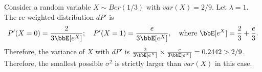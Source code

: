 \documentclass[11pt]{article}
\theoremstyle{plain}
\theoremstyle{definition}
\begin{document}
Consider a random variable $X \sim Ber(1/3)$ with $var(X) = 2/9$. Let $\lambda = 1$. The re-weighted distribution $dP'$ is
\[ P'(X = 0) = \frac{2}{3\bbE[ e^{X} ]};\quad  P'(X = 1) = \frac{e}{3\bbE[ e^{X} ]}, \quad \text{where } \bbE[ e^{X} ] = \frac{2}{3} + \frac{e}{3}.  \]
Therefore, the variance of $X$ with $dP'$ is $\frac{2}{3\bbE[ e^{X} ]} \times  \frac{e}{3\bbE[ e^{X} ]} = 0.2442 > 2/9$. Therefore, the smallest possible $\sigma^2$ is strictly larger than $var(X)$ in this case.
\end{document}
